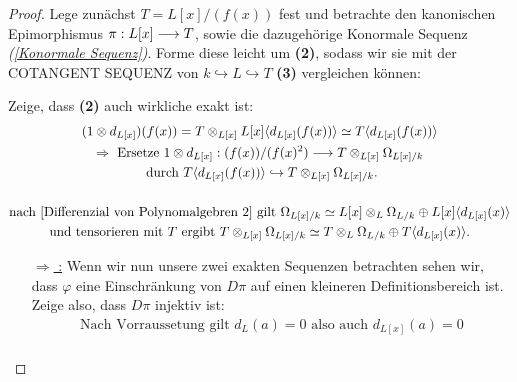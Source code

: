 \documentclass[10pt,a4paper]{report}
\newcommand{\functionfront}[3]{\nolinebreak{#1:#2 \longrightarrow #3}}
\newcommand{\divR}[2]{\Omega_{#1/#2}}
\newcommand{\divf}[1]{d_{#1}}
\newcommand{\Tensor}[3]{#1 \otimes_{#2} #3}
\newcommand{\tensor}[3]{#1 \otimes #3}
\newcommand{\Verz}[1]{\langle #1 \rangle}
\begin{document}
\begin{proof}
Lege zunächst $T =L[x]/(f(x))$ fest und betrachte den kanonischen Epimorphismus $\functionfront{\pi}{L[x]}{T}$, sowie die dazugehörige Konormale Sequenz \textit{(\cref{Konormale Sequenz})}. Forme diese leicht um \textbf{(2)}, sodass wir sie mit der COTANGENT SEQUENZ von $k \hookrightarrow L \hookrightarrow T$ \textbf{(3)} vergleichen können:
\begin{center}
\end{center}
Zeige, dass \textbf{(2)} auch wirkliche exakt ist:
\begin{gather*}
(\tensor{1}{L[x]}{\divf{L[x]}})(f(x))
 =  \Tensor{T}{L[x]}{L[x]\Verz{\divf{L[x]}(f(x))}}
  \simeq T \Verz{\divf{L[x]}(f(x))} \\
\Rightarrow \text{ Ersetze } \functionfront{\tensor{1}{L[x]}{\divf{L[x]}}}{(f(x))/(f(x)^2)}{\Tensor{T}{L[x]}{\divR{L[x]}{k}}}\\ \text{ durch }  T \Verz{\divf{L[x]}(f(x))} \hookrightarrow \Tensor{T}{L[x]}{\divR{L[x]}{k}}. \\
\ \\
\text{nach \cref{Differenzial von Polynomalgebren 2} gilt } \divR{L[x]}{k} \simeq \Tensor{L[x]}{L}{\divR{L}{k}} \oplus L[x]\Verz{\divf{L[x]}(x)}\\
\text{und tensorieren mit $T$ ergibt } \Tensor{T}{L[x]}{\divR{L[x]}{k}} \simeq \Tensor{T}{L}{\divR{L}{k}} \oplus T\Verz{\divf{L[x]}(x)}.
\end{gather*}
\begin{itemize}
\item[\underline{\glqq $\Rightarrow$ \grqq:}]
Wenn wir nun unsere zwei exakten Sequenzen betrachten sehen wir, dass $\varphi$ eine Einschränkung von $D\pi$ auf einen kleineren Definitionsbereich ist. Zeige also, dass $D\pi$ injektiv ist:
\begin{gather*}
\text{Nach Vorraussetung gilt } \divf{L}(a) = 0 \text{ also auch } \divf{L[x]}(a) = 0\\

\end{gather*}
\end{itemize}
\end{proof}
\end{document}
